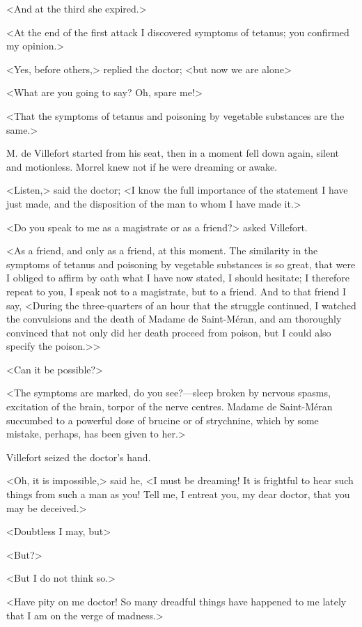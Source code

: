  <And at the third she expired.> 

 <At the end of the first attack I discovered symptoms of tetanus; you confirmed my opinion.> 

 <Yes, before others,> replied the doctor; <but now we are alone\longdash> 

 <What are you going to say? Oh, spare me!> 

 <That the symptoms of tetanus and poisoning by vegetable substances are the same.> 

 M. de Villefort started from his seat, then in a moment fell down again, silent and motionless. Morrel knew not if he were dreaming or awake. 

 <Listen,> said the doctor; <I know the full importance of the statement I have just made, and the disposition of the man to whom I have made it.> 

 <Do you speak to me as a magistrate or as a friend?> asked Villefort. 

 <As a friend, and only as a friend, at this moment. The similarity in the symptoms of tetanus and poisoning by vegetable substances is so great, that were I obliged to affirm by oath what I have now stated, I should hesitate; I therefore repeat to you, I speak not to a magistrate, but to a friend. And to that friend I say, <During the three-quarters of an hour that the struggle continued, I watched the convulsions and the death of Madame de Saint-Méran, and am thoroughly convinced that not only did her death proceed from poison, but I could also specify the poison.>> 

 <Can it be possible?> 

 <The symptoms are marked, do you see?—sleep broken by nervous spasms, excitation of the brain, torpor of the nerve centres. Madame de Saint-Méran succumbed to a powerful dose of brucine or of strychnine, which by some mistake, perhaps, has been given to her.> 

 Villefort seized the doctor's hand. 

 <Oh, it is impossible,> said he, <I must be dreaming! It is frightful to hear such things from such a man as you! Tell me, I entreat you, my dear doctor, that you may be deceived.> 

 <Doubtless I may, but\longdash> 

 <But?>

<But I do not think so.> 

 <Have pity on me doctor! So many dreadful things have happened to me lately that I am on the verge of madness.> 

